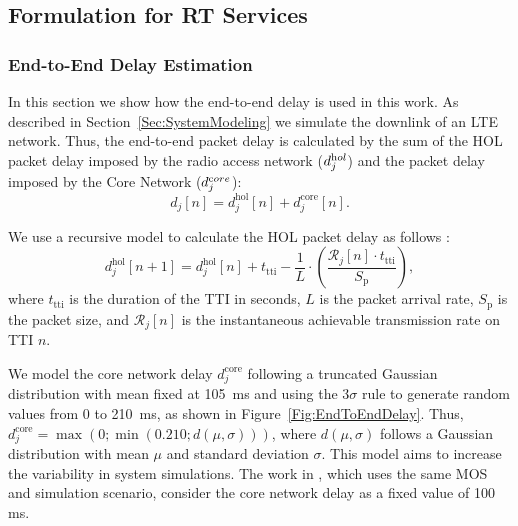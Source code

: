 \documentclass[12pt]{article}
\newcommand{\FigRef}[1]{Figure~\ref{#1}}
\newcommand{\SecRef}[1]{Section~\ref{#1}}
\newcommand{\AppRef}[1]{Appendix~\ref{#1}}
\begin{document}
%

\subsection{Formulation for RT Services}
\label{Sec:FormRT}

\subsubsection{End-to-End Delay Estimation}
In this section we show how the end-to-end delay is used in this work. As described in \SecRef{Sec:SystemModeling}
we simulate the downlink of an LTE network. Thus, the end-to-end packet delay is calculated by the sum of the \ac{HOL} packet delay imposed by the radio access network ($d_j ^{\text hol}$) and the packet delay imposed by the Core Network ($d_j^{\text core}$):
%
\begin{equation}
\label{Eq:endToEndDelay}
d_j[n] = d_{j}^\text{hol}[n] + d_j^\text{core}[n].
\end{equation}

We use a recursive model to calculate the \ac{HOL} packet delay as follows \cite{Rodrigues2014_Wiley}:
%
\begin{equation}
\label{Eq:HOL_Delay}
d_{j}^\mathrm{hol}\left[n+1\right] = d_{j}^\mathrm{hol}\left[n\right] + t_{\text{tti}} - \frac{1}{L} \cdot \left( \frac{\mathcal{R}_{j}[n] \cdot t_{\text{tti}}}{S_\mathrm{p}}\right),
\end{equation}
%
where $t_{\text{tti}}$ is the duration of the \ac{TTI} in seconds, $L$ is the packet arrival rate, $S_\mathrm{p}$ is the packet size, and $\mathcal{R}_{j}[n]$ is the instantaneous achievable transmission rate on \ac{TTI} $n$.

We model the core network delay $d_j^\text{core}$ following a truncated Gaussian distribution with mean fixed at \SI{105}{\ms} and using the $3\sigma$ rule to generate random values from 0 to \SI{210}{\ms}, as shown in \FigRef{Fig:EndToEndDelay}. %
Thus, $d_j^\text{core} = \max(0; \min(0.210; d(\mu, \sigma)))$, where $ d(\mu, \sigma) $ follows a Gaussian distribution with mean $ \mu $ and standard deviation $ \sigma $. %
This model aims to increase the variability in system simulations. The work in \cite{liu2012novel}, which uses the same MOS and simulation scenario, consider the core network delay as a fixed value of 100 ms. 
\end{document}
